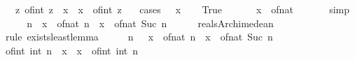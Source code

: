 \begin{isabellebody}
\ \ \ {\isachardoublequoteopen}{\isasymexists}z{\isachardot}{\kern0pt}\ of{\isacharunderscore}{\kern0pt}int\ z\ {\isasymle}\ x\ {\isasymand}\ x\ {\isacharless}{\kern0pt}\ of{\isacharunderscore}{\kern0pt}int\ {\isacharparenleft}{\kern0pt}z\ {\isacharplus}{\kern0pt}\ {}{\isacharparenright}{\kern0pt}{\isachardoublequoteclose}\isanewline
%
\isadelimproof
%
\endisadelimproof
%
\isatagproof
{}\isamarkupfalse%
\ {\isacharparenleft}{\kern0pt}cases\ {\isachardoublequoteopen}{}\ {\isasymle}\ x{\isachardoublequoteclose}{\isacharparenright}{\kern0pt}\isanewline
\ \ \isamarkupfalse%
\ True\isanewline
\ \ \isamarkupfalse%
\ \isamarkupfalse%
\ {\isachardoublequoteopen}{\isasymnot}\ x\ {\isacharless}{\kern0pt}\ of{\isacharunderscore}{\kern0pt}nat\ {}{\isachardoublequoteclose}\isanewline
\ \ \ \ \isamarkupfalse%
\ simp\isanewline
\ \ \isamarkupfalse%
\ \isamarkupfalse%
\ {\isachardoublequoteopen}{\isasymexists}n{\isachardot}{\kern0pt}\ {\isasymnot}\ x\ {\isacharless}{\kern0pt}\ of{\isacharunderscore}{\kern0pt}nat\ n\ {\isasymand}\ x\ {\isacharless}{\kern0pt}\ of{\isacharunderscore}{\kern0pt}nat\ {\isacharparenleft}{\kern0pt}Suc\ n{\isacharparenright}{\kern0pt}{\isachardoublequoteclose}\isanewline
\ \ \ \ \isamarkupfalse%
\ reals{\isacharunderscore}{\kern0pt}Archimedean{}\ \isamarkupfalse%
\ {\isacharparenleft}{\kern0pt}rule\ exists{\isacharunderscore}{\kern0pt}least{\isacharunderscore}{\kern0pt}lemma{\isacharparenright}{\kern0pt}\isanewline
\ \ \isamarkupfalse%
\ \isamarkupfalse%
\ n\ \ {\isachardoublequoteopen}{\isasymnot}\ x\ {\isacharless}{\kern0pt}\ of{\isacharunderscore}{\kern0pt}nat\ n\ {\isasymand}\ x\ {\isacharless}{\kern0pt}\ of{\isacharunderscore}{\kern0pt}nat\ {\isacharparenleft}{\kern0pt}Suc\ n{\isacharparenright}{\kern0pt}{\isachardoublequoteclose}\ \isacommand{{\isachardot}{\kern0pt}{\isachardot}{\kern0pt}}\isamarkupfalse%
\isanewline
\ \ \isamarkupfalse%
\ \isamarkupfalse%
\ {\isachardoublequoteopen}of{\isacharunderscore}{\kern0pt}int\ {\isacharparenleft}{\kern0pt}int\ n{\isacharparenright}{\kern0pt}\ {\isasymle}\ x\ {\isasymand}\ x\ {\isacharless}{\kern0pt}\ of{\isacharunderscore}{\kern0pt}int\ {\isacharparenleft}{\kern0pt}int\ n\ {\isacharplus}{\kern0pt}\ {}{\isacharparenright}{\kern0pt}{\isachardoublequoteclose}\isanewline
\ \ \ \ \isamarkupfalse%

\end{isabellebody}
